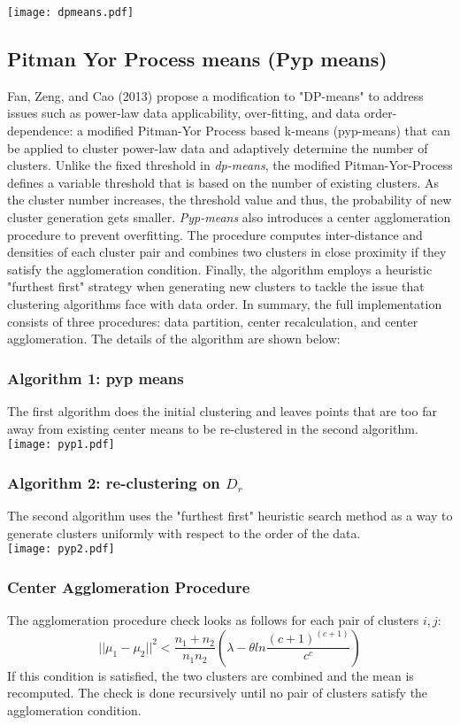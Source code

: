 \documentclass{article}
\begin{document}
\noindent
\texttt{[image: dpmeans.pdf]}

\subsection{Pitman Yor Process means (Pyp means)}
\noindent
Fan, Zeng, and Cao (2013) propose a modification to "DP-means" to address issues such as power-law data applicability, over-fitting, and data order-dependence: a modified Pitman-Yor Process based k-means (pyp-means) that can be applied to cluster power-law data and adaptively determine the number of clusters.  Unlike the fixed threshold in \emph{dp-means}, the modified Pitman-Yor-Process defines a variable threshold that is based on the number of existing clusters.  As the cluster number increases, the threshold value and thus, the probability of new cluster generation gets smaller.  \emph{Pyp-means} also introduces a center agglomeration procedure to prevent overfitting.  The procedure computes inter-distance and densities of each cluster pair and combines two clusters in close proximity if they satisfy the agglomeration condition.  Finally, the algorithm employs a heuristic "furthest first" strategy when generating new clusters to tackle the issue that clustering algorithms face with data order.  In summary, the full implementation consists of three procedures:  data partition, center recalculation, and center agglomeration.  The details of the algorithm are shown below:
\subsubsection{Algorithm 1: pyp means}
\noindent
The first algorithm does the initial clustering and leaves points that are too far away from existing center means to be re-clustered in the second algorithm. \\
\texttt{[image: pyp1.pdf]} 

\subsubsection{Algorithm 2: re-clustering on $D_r$}

The second algorithm uses the "furthest first" heuristic search method as a way to generate clusters uniformly with respect to the order of the data. \\
\texttt{[image: pyp2.pdf]}

\subsubsection{Center Agglomeration Procedure}
\noindent
The agglomeration procedure check looks as follows for each pair of clusters $i, j$:
$$ ||\mu_1 - \mu_2||^2 < \frac{n_1 + n_2}{n_1 n_2} (\lambda - \theta ln \frac{(c+1)^{(c+1)}}{c^c}) $$
If this condition is satisfied, the two clusters are combined and the mean is recomputed.  The check is done recursively until no pair of clusters satisfy the agglomeration condition.
\end{document}
